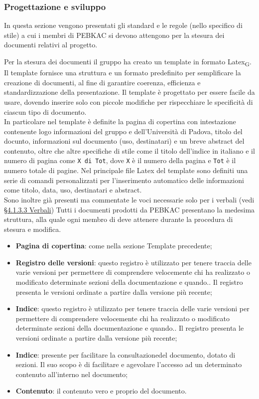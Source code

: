 \subsubsection{Progettazione e sviluppo}
In questa sezione vengono presentati gli standard e le regole (nello specifico di stile) a cui i membri di PEBKAC si devono attengono per la stesura dei documenti relativi al progetto.

Per la stesura dei documenti il gruppo ha creato un template in formato Latex\textsubscript{G}. Il template fornisce una struttura e un formato predefinito per semplificare la creazione di documenti, al fine di garantire coerenza, efficienza e standardizzazione della presentazione. 
Il template è progettato per essere facile da usare, dovendo inserire solo con piccole modifiche per rispecchiare le specificità di ciascun tipo di documento.\\
In particolare nel template è definite la pagina di copertina con intestazione contenente logo informazioni del gruppo e dell'Università di Padova, titolo del docunto, informazioni sul documento (uso, destinatari) e un breve abstract del contenuto, oltre che altre specifiche di stile come il titolo dell'indice in italiano e il numero di pagina come \texttt{X di Tot}, dove \texttt{X} è il numero della pagina e \texttt{Tot} è il numero totale di pagine.
Nel principale file Latex del template sono definiti una serie di comandi personalizzati per l'inserimento automatico delle informazioni come titolo, data, uso, destinatari e abstract. \\
Sono inoltre già presenti ma commentate le voci necessarie solo per i verbali (vedi  \hyperref[sec: struttura verbali]{§4.1.3.3 Verbali})
Tutti i documenti prodotti da PEBKAC presentano la medesima struttura, alla quale ogni membro di deve attenere durante la procedura di stesura e modifica.
\begin{itemize}
    \item \textbf{Pagina di copertina}: come nella sezione Template precedente;
    \item \textbf{Registro delle versioni}: questo registro è utilizzato per tenere traccia delle varie versioni per permettere di comprendere velocemente chi ha realizzato o modificato determinate sezioni della documentazione e quando.. Il registro presenta le versioni ordinate a partire dalla versione più recente;
     \item \textbf{Indice}: questo registro è utilizzato per tenere traccia delle varie versioni per permettere di comprendere velocemente chi ha realizzato o modificato determinate sezioni della documentazione e quando.. Il registro presenta le versioni ordinate a partire dalla versione più recente;
     \item \textbf{Indice}: presente per facilitare la consultazionedel documento, dotato di sezioni. Il suo scopo è di facilitare e agevolare l’accesso ad un determinato contenuto all'interno nel documento;
     \item \textbf{Contenuto}: il contenuto vero e proprio del documento.
\end{itemize}

